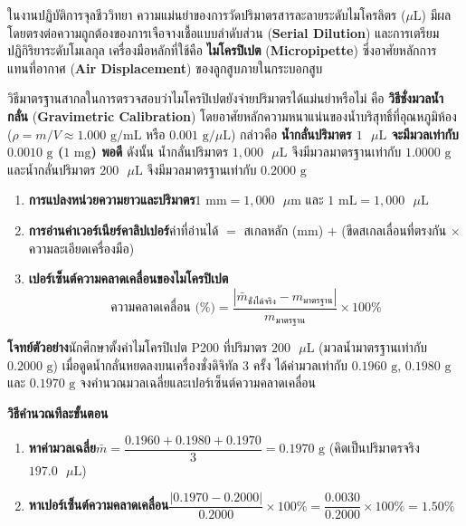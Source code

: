 ในงานปฏิบัติการจุลชีววิทยา ความแม่นยำของการวัดปริมาตรสารละลายระดับไมโครลิตร ($\mu\text{L}$) มีผลโดยตรงต่อความถูกต้องของการเจือจางเชื้อแบบลำดับส่วน (\textbf{Serial Dilution}) และการเตรียมปฏิกิริยาระดับโมเลกุล เครื่องมือหลักที่ใช้คือ \textbf{ไมโครปิเปต} (\textbf{Micropipette}) ซึ่งอาศัยหลักการแทนที่อากาศ (\textbf{Air Displacement}) ของลูกสูบภายในกระบอกสูบ

วิธีมาตรฐานสากลในการตรวจสอบว่าไมโครปิเปตยังจ่ายปริมาตรได้แม่นยำหรือไม่ คือ \textbf{วิธีชั่งมวลน้ำกลั่น} (\textbf{Gravimetric Calibration}) โดยอาศัยหลักความหนาแน่นของน้ำบริสุทธิ์ที่อุณหภูมิห้อง ($\rho = m / V \approx 1.000\text{ g/mL}$ หรือ $0.001\text{ g/}\mu\text{L}$) กล่าวคือ \textbf{น้ำกลั่นปริมาตร $1\text{ }\mu\text{L}$ จะมีมวลเท่ากับ $0.0010\text{ g}$ ($1\text{ mg}$) พอดี} ดังนั้น น้ำกลั่นปริมาตร $1{,}000\text{ }\mu\text{L}$ จึงมีมวลมาตรฐานเท่ากับ $1.0000\text{ g}$ และน้ำกลั่นปริมาตร $200\text{ }\mu\text{L}$ จึงมีมวลมาตรฐานเท่ากับ $0.2000\text{ g}$

\begin{conceptbox}
\begin{enumerate}
    \item \textbf{การแปลงหน่วยความยาวและปริมาตร}\quad $1\text{ mm} = 1{,}000\text{ }\mu\text{m}$ และ $1\text{ mL} = 1{,}000\text{ }\mu\text{L}$
    \item \textbf{การอ่านค่าเวอร์เนียร์คาลิปเปอร์}\quad ค่าที่อ่านได้ $=$ สเกลหลัก ($\text{mm}$) $+$ (ขีดสเกลเลื่อนที่ตรงกัน $\times$ ความละเอียดเครื่องมือ)
    \item \textbf{เปอร์เซ็นต์ความคลาดเคลื่อนของไมโครปิเปต}
    \begin{equation}
        \text{ความคลาดเคลื่อน (\%)} = \frac{|\bar{m}_{\text{ชั่งได้จริง}} - m_{\text{มาตรฐาน}}|}{m_{\text{มาตรฐาน}}} \times 100\%
    \end{equation}
\end{enumerate}
\end{conceptbox}

\begin{worked}
\textbf{โจทย์ตัวอย่าง}\quad นักศึกษาตั้งค่าไมโครปิเปต P200 ที่ปริมาตร $200\text{ }\mu\text{L}$ (มวลน้ำมาตรฐานเท่ากับ $0.2000\text{ g}$) เมื่อดูดน้ำกลั่นหยดลงบนเครื่องชั่งดิจิทัล 3 ครั้ง ได้ค่ามวลเท่ากับ $0.1960\text{ g}$, $0.1980\text{ g}$ และ $0.1970\text{ g}$ จงคำนวณมวลเฉลี่ยและเปอร์เซ็นต์ความคลาดเคลื่อน

\textbf{วิธีคำนวณทีละขั้นตอน}
\begin{enumerate}
    \item \textbf{หาค่ามวลเฉลี่ย}\quad $\bar{m} = \dfrac{0.1960 + 0.1980 + 0.1970}{3} = 0.1970\text{ g}$ (คิดเป็นปริมาตรจริง $197.0\text{ }\mu\text{L}$)
    \item \textbf{หาเปอร์เซ็นต์ความคลาดเคลื่อน}\quad $\dfrac{|0.1970 - 0.2000|}{0.2000} \times 100\% = \dfrac{0.0030}{0.2000} \times 100\% = 1.50\%$
\end{enumerate}
\end{worked}

